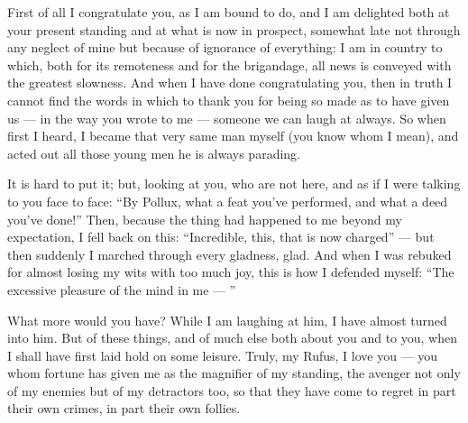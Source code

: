 

 First of all I congratulate you, as I am bound to do, and I am delighted both at your present standing and at what is now in prospect, somewhat late not through any neglect of mine but because of ignorance of everything: I am in country to which, both for its remoteness and for the brigandage, all news is conveyed with the greatest slowness. And when I have done congratulating you, then in truth I cannot find the words in which to thank you for being so made as to have given us --- in the way you wrote to me --- someone we can laugh at always. So when first I heard, I became that very same man myself (you know whom I mean), and acted out all those young men he is always parading.

 It is hard to put it; but, looking at you, who are not here, and as if I were talking to you face to face: ``By Pollux, what a feat you've performed, and what a deed you've done!'' Then, because the thing had happened to me beyond my expectation, I fell back on this: ``Incredible, this, that is now charged'' --- but then suddenly I marched through every gladness, glad. And when I was rebuked for almost losing my wits with too much joy, this is how I defended myself: ``The excessive pleasure of the mind in me --- ''

 What more would you have? While I am laughing at him, I have almost turned into him. But of these things, and of much else both about you and to you, when I shall have first laid hold on some leisure. Truly, my Rufus, I love you --- you whom fortune has given me as the magnifier of my standing, the avenger not only of my enemies but of my detractors too, so that they have come to regret in part their own crimes, in part their own follies.

